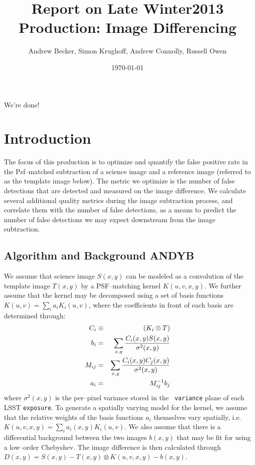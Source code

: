 \documentclass[prd, nofootinbib, floatfix, 11pt,tightenlines,times]{article}
\author{Andrew Becker, Simon Krughoff, Andrew Connolly, Russell Owen}
\title{Report on Late Winter2013 Production: Image Differencing}
\date{\today}
\begin{document}
\maketitle

We're done!

\clearpage
\tableofcontents
\clearpage

\section{Introduction}

The focus of this production is to optimize and quantify the false
positive rate in the Psf--matched subtraction of a science image and a
reference image (referred to as the template image below).  The metric
we optimize is the number of false detections that are detected and
measured on the image difference.  We calculate several additional
quality metrics during the image subtraction process, and correlate
them with the number of false detections, as a means to predict the
number of false detections we may expect downstream from the image
subtraction.

\subsection{Algorithm and Background {\bf ANDYB}}

We assume that science image $S(x,y)$ can be modeled as a convolution
of the template image $T(x,y)$ by a PSF--matching kernel $K(u,v,x,y)$.
We further assume that the kernel may be decomposed using a set of
basis functions $K(u,v) = \sum_i a_i K_i(u,v)$, where the coefficients
in front of each basis are determined through:
%
\begin{eqnarray}
C_i & \equiv & (K_i \otimes T) \\ \nonumber
b_{i}  & = & \sum_{x,y} {{C_i(x,y) S(x,y)}\over{\sigma^2(x,y)}}   \nonumber \\ 
M_{ij} & = & \sum_{x,y} {{C_i(x,y) C_j(x,y)}\over{\sigma^2(x,y)}}  \nonumber \\ 
a_{i}  & = & M^{-1}_{ij} b_{j} \nonumber 
\label{eq-soln}
\end{eqnarray}
where $\sigma^2(x,y)$ is the per--pixel variance stored in the {\tt
  variance} plane of each LSST {\tt exposure}.  To generate a
spatially varying model for the kernel, we assume that the relative
weights of the basis functions $a_i$ themselves vary spatially,
i.e. $K(u,v,x,y) = \sum_i a_i(x,y) K_i(u,v)$.  We also assume that
there is a differential background between the two images $b(x,y)$
that may be fit for using a low--order Chebyshev.  The image
difference is then calculated through $D(x,y) = S(x,y) - T(x,y)
\otimes K(u,v,x,y) - b(x,y)$.
\end{document}
